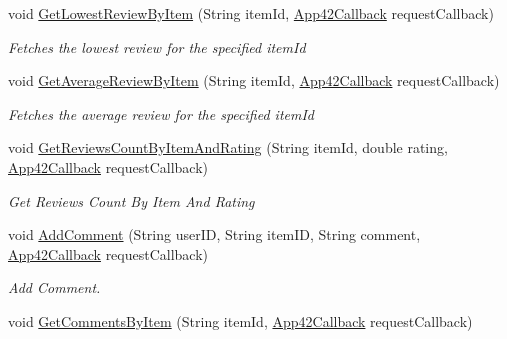 \begin{DoxyCompactItemize}
\item 
void \hyperlink{classcom_1_1shephertz_1_1app42_1_1paas_1_1sdk_1_1windows_1_1review_1_1_review_service_aba082b5d6bd974ec105e41ba5f40e4cc}{Get\+Lowest\+Review\+By\+Item} (String item\+Id, \hyperlink{interfacecom_1_1shephertz_1_1app42_1_1paas_1_1sdk_1_1windows_1_1_app42_callback}{App42\+Callback} request\+Callback)
\begin{DoxyCompactList}\small\item\em Fetches the lowest review for the specified item\+Id \end{DoxyCompactList}\item 
void \hyperlink{classcom_1_1shephertz_1_1app42_1_1paas_1_1sdk_1_1windows_1_1review_1_1_review_service_a27d4cef7498d44c97205c05d28cee47d}{Get\+Average\+Review\+By\+Item} (String item\+Id, \hyperlink{interfacecom_1_1shephertz_1_1app42_1_1paas_1_1sdk_1_1windows_1_1_app42_callback}{App42\+Callback} request\+Callback)
\begin{DoxyCompactList}\small\item\em Fetches the average review for the specified item\+Id \end{DoxyCompactList}\item 
void \hyperlink{classcom_1_1shephertz_1_1app42_1_1paas_1_1sdk_1_1windows_1_1review_1_1_review_service_a1444df77ea0d771abee846cc0cfd3477}{Get\+Reviews\+Count\+By\+Item\+And\+Rating} (String item\+Id, double rating, \hyperlink{interfacecom_1_1shephertz_1_1app42_1_1paas_1_1sdk_1_1windows_1_1_app42_callback}{App42\+Callback} request\+Callback)
\begin{DoxyCompactList}\small\item\em Get Reviews Count By Item And Rating \end{DoxyCompactList}\item 
void \hyperlink{classcom_1_1shephertz_1_1app42_1_1paas_1_1sdk_1_1windows_1_1review_1_1_review_service_aa0a4818bc26ce8960e4f6da15a946d07}{Add\+Comment} (String user\+I\+D, String item\+I\+D, String comment, \hyperlink{interfacecom_1_1shephertz_1_1app42_1_1paas_1_1sdk_1_1windows_1_1_app42_callback}{App42\+Callback} request\+Callback)
\begin{DoxyCompactList}\small\item\em Add Comment. \end{DoxyCompactList}\item 
void \hyperlink{classcom_1_1shephertz_1_1app42_1_1paas_1_1sdk_1_1windows_1_1review_1_1_review_service_aabb790d8715e1d30bd13d1de1cbbb909}{Get\+Comments\+By\+Item} (String item\+Id, \hyperlink{interfacecom_1_1shephertz_1_1app42_1_1paas_1_1sdk_1_1windows_1_1_app42_callback}{App42\+Callback} request\+Callback)

\end{DoxyCompactItemize}
